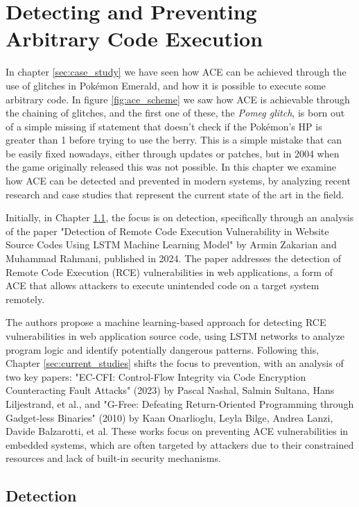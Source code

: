 \documentclass[a4paper]{usiinfbachelorproject}
\begin{document}
\section{Detecting and Preventing Arbitrary Code Execution}
\label{sec:state_of_the_art}

In chapter \ref{sec:case_study} we have seen how ACE can be achieved through the use of glitches in Pokémon Emerald, and how it is possible to execute some arbitrary code. In figure \ref{fig:ace_scheme} we saw how ACE is achievable through the chaining of glitches, and the first one of these, the \textit{Pomeg glitch}, is born out of a simple missing if statement that doesn't check if the Pokémon's HP is greater than 1 before trying to use the berry. This is a simple mistake that can be easily fixed nowadays, either through updates or patches, but in 2004 when the game originally released this was not possible. In this chapter we examine how ACE can be detected and prevented in modern systems, by analyzing recent research and case studies that represent the current state of the art in the field.

Initially, in Chapter \ref{sec:today}, the focus is on detection, specifically through an analysis of the paper "Detection of Remote Code Execution Vulnerability in Website Source Codes Using LSTM Machine Learning Model" by Armin Zakarian and Muhammad Rahmani, published in 2024.\cite{zakarian2024lstm} The paper addresses the detection of Remote Code Execution (RCE) vulnerabilities in web applications, a form of ACE that allows attackers to execute unintended code on a target system remotely.

The authors propose a machine learning-based approach for detecting RCE vulnerabilities in web application source code, using LSTM networks to analyze program logic and identify potentially dangerous patterns.
Following this, Chapter \ref{sec:current_studies} shifts the focus to prevention, with an analysis of two key papers: "EC-CFI: Control-Flow Integrity via Code Encryption Counteracting Fault Attacks" (2023) by Pascal Nashal, Salmin Sultana, Hans Liljestrand, et al.,\cite{nasahl2023eccfi} and "G-Free: Defeating Return-Oriented Programming through Gadget-less Binaries" (2010) by Kaan Onarlioglu, Leyla Bilge, Andrea Lanzi, Davide Balzarotti, et al. These works focus on preventing ACE vulnerabilities in embedded systems, which are often targeted by attackers due to their constrained resources and lack of built-in security mechanisms.


\subsection{Detection}
\label{sec:today}
\end{document}
